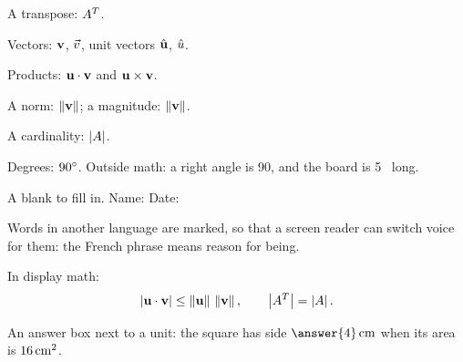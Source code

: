 \documentclass{ximera}
\begin{document}
A transpose: $\xmtrans{A}$.

Vectors: $\xmvec{v}$, $\xmvec*{v}$, unit vectors $\xmunitvec{u}$,
$\xmunitvec*{u}$.

Products: $\xmdot{\xmvec{u}}{\xmvec{v}}$ and
$\xmcross{\xmvec{u}}{\xmvec{v}}$.

A norm: $\xmnorm{\xmvec{v}}$; a magnitude: $\xmnorm[magnitude]{\xmvec{v}}$.

A cardinality: $\left\lvert A \right\rvert$.

Degrees: $90 {} ^ { \circ } $. Outside math: a right angle is 90\xmdeg, and the
board is 5~ long.

A blank to fill in. Name: \xmblank[2.5in] \quad Date: \xmblank

Words in another language are marked, so that a screen reader can switch
voice for them: the French phrase  means reason
for being.

In display math:
\[
\xmabs{\xmdot{\xmvec{u}}{\xmvec{v}}} \le \xmnorm{\xmvec{u}}\,\xmnorm{\xmvec{v}},
\qquad \xmdet{\xmtrans{A}} = \xmdet{A} .
\]

\begin{problem}
An answer box next to a unit: the square has side $\answer{4}\,\xmunits{cm}$
when its area is $16\,\xmunits{cm}^2$.
\end{problem}
\end{document}
